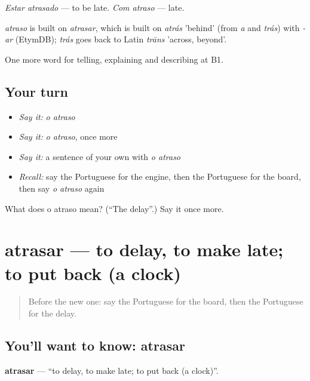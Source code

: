 \emph{Estar atrasado} — to be late. \emph{Com atraso} — late.

\begin{cousinweb}
\emph{atraso} is built on \emph{atrasar}, which is built on \emph{atrás} 'behind' (from \emph{a} and \emph{trás}) with \emph{-ar} (EtymDB); \emph{trás} goes back to Latin \emph{trāns} 'across, beyond'.
\end{cousinweb}

\begin{grammarlens}[title={What you've built}]
One more word for telling, explaining and describing at B1.
\end{grammarlens}

\subsection*{Your turn}
\begin{itemize}
\raggedright
  \item \emph{Say it:} \emph{o atraso}
  \item \emph{Say it:} \emph{o atraso}, once more
  \item \emph{Say it:} a sentence of your own with \emph{o atraso}
  \item \emph{Recall:} say the Portuguese for the engine, then the Portuguese for the board, then say \emph{o atraso} again
\end{itemize}

\begin{tcolorbox}[breakable,colback=teal!4,colframe=teal!35!black,title={Before you move on}]
What does o atraso mean? (\textquotedblleft{}The delay\textquotedblright{}.) Say it once more.
\end{tcolorbox}
\section[atrasar]{atrasar — to delay, to make late; to put back (a clock)}

\label{lesson:PT-C416-atrasar}



\begin{quote}
Before the new one: say the Portuguese for the board, then the Portuguese for the delay.
\end{quote}

\subsection*{You'll want to know: atrasar}
\textbf{atrasar} — \textquotedblleft{}to delay, to make late; to put back (a clock)\textquotedblright{}.

